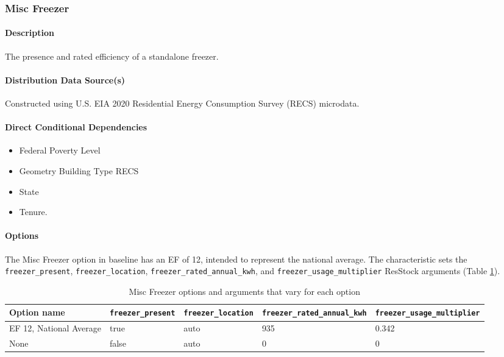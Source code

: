 \subsubsection{Misc Freezer}
\paragraph{Description}
The presence and rated efficiency of a standalone freezer.
\paragraph{Distribution Data Source(s)}
Constructed using U.S. EIA 2020 Residential Energy Consumption Survey (RECS) microdata.
\paragraph{Direct Conditional Dependencies}
\begin{itemize}
    \item Federal Poverty Level
    \item Geometry Building Type RECS
    \item State
    \item Tenure.
\end{itemize}

\paragraph{Options}
The Misc Freezer option in baseline has an EF of 12, intended to represent the national average. The characteristic sets the \texttt{freezer\_present}, \texttt{freezer\_location}, \texttt{freezer\_rated\_annual\_kwh}, and \texttt{freezer\_usage\_multiplier} ResStock arguments (Table \ref{table:hc_opt_freezer}).

\begin{longtable}[]{ |p{3cm}|p{3cm}|p{3cm}|p{3cm}|p{3cm}| }
\caption{Misc Freezer options and arguments that vary for each option} \label{table:hc_opt_freezer} \\
\toprule\noalign{}
Option name & \texttt{freezer\_present} &
\texttt{freezer\_location} & \texttt{freezer\_rated\_annual\_kwh} &
\texttt{freezer\_usage\_multiplier} \\
\midrule\noalign{}
\endhead
\bottomrule\noalign{}
\endlastfoot
EF 12, National Average & true & auto & 935 & 0.342 \\
None & false & auto & 0 & 0 \\
\end{longtable}

